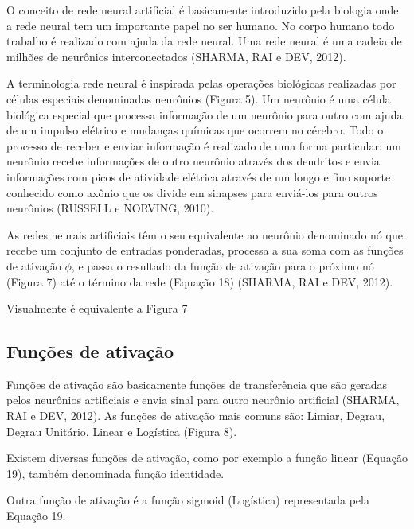 O conceito de rede neural artificial é basicamente introduzido pela biologia onde a rede neural tem um importante papel no ser humano. No corpo humano todo trabalho é realizado com ajuda da rede neural. Uma rede neural é uma cadeia de milhões de neurônios interconectados (SHARMA, RAI e DEV, 2012).

A terminologia rede neural é inspirada pelas operações biológicas realizadas por células especiais denominadas neurônios (Figura 5). Um neurônio é uma célula biológica especial que processa informação de um neurônio para outro com ajuda de um impulso elétrico e mudanças químicas que ocorrem no cérebro. Todo o processo de receber e enviar informação é realizado de uma forma particular: um neurônio recebe informações de outro neurônio através dos dendritos e envia informações com picos de atividade elétrica através de um longo e fino suporte conhecido como axônio que os divide em sinapses para enviá-los para outros neurônios (RUSSELL e NORVING, 2010).


As redes neurais artificiais têm o seu equivalente ao neurônio denominado nó que recebe um conjunto de entradas ponderadas, processa a sua soma com as funções de ativação $\phi$, e passa o resultado da função de ativação para o próximo nó (Figura 7) até o término da rede (Equação 18) (SHARMA, RAI e DEV, 2012).

Visualmente é equivalente a Figura 7

\subsection{Funções de ativação}

Funções de ativação são basicamente funções de transferência que são geradas pelos neurônios artificiais e envia sinal para outro neurônio artificial (SHARMA, RAI e DEV, 2012). As funções de ativação mais comuns são: Limiar, Degrau, Degrau Unitário, Linear e Logística (Figura 8). 

Existem diversas funções de ativação, como por exemplo a função linear (Equação  19), também denominada função identidade.

Outra função de ativação é a função sigmoid (Logística) representada pela Equação 19.

